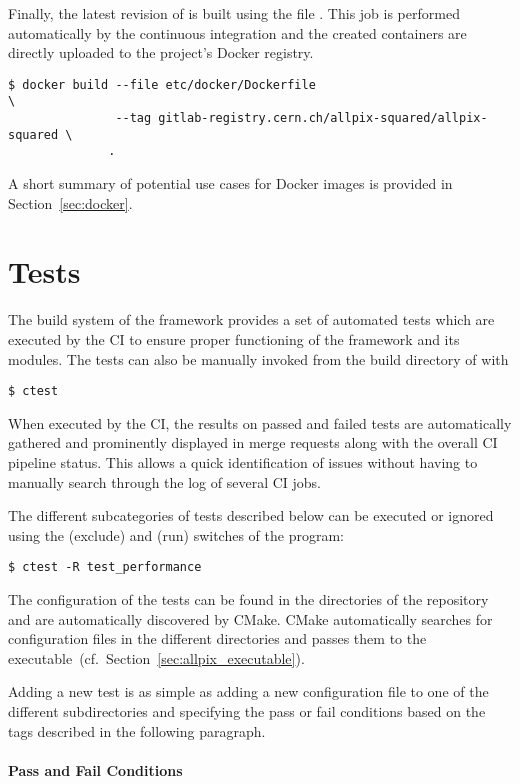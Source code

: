 Finally, the latest revision of \apsq is built using the file .
This job is performed automatically by the continuous integration and the created containers are directly uploaded to the project's Docker registry.
\begin{verbatim}
$ docker build --file etc/docker/Dockerfile                                \
               --tag gitlab-registry.cern.ch/allpix-squared/allpix-squared \
              .
\end{verbatim}

A short summary of potential use cases for Docker images is provided in Section~\ref{sec:docker}.

\section{Tests}
\label{sec:tests}

The build system of the framework provides a set of automated tests which are executed by the CI to ensure proper functioning of the framework and its modules.
The tests can also be manually invoked from the build directory of \apsq with
\begin{verbatim}
$ ctest
\end{verbatim}
When executed by the CI, the results on passed and failed tests are automatically gathered and prominently displayed in merge requests along with the overall CI pipeline status.
This allows a quick identification of issues without having to manually search through the log of several CI jobs.

The different subcategories of tests described below can be executed or ignored using the \command{-E} (exclude) and  (run) switches of the  program:
\begin{verbatim}
$ ctest -R test_performance
\end{verbatim}

The configuration of the tests can be found in the  directories of the repository and are automatically discovered by CMake.
CMake automatically searches for \apsq configuration files in the different directories and passes them to the \apsq executable~(cf.\ Section~\ref{sec:allpix_executable}).

Adding a new test is as simple as adding a new configuration file to one of the different subdirectories and specifying the pass or fail conditions based on the tags described in the following paragraph.

\paragraph{Pass and Fail Conditions}

